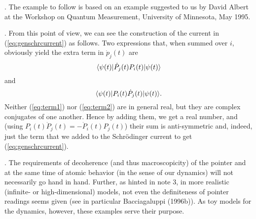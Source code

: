 \documentclass[12pt]{article}
\newcommand{\be}{\vspace*{6pt} \begin{equation}}
\newcommand{\ee}{\vspace*{10pt} \end{equation}}
\newcommand{\bra}[1]{\langle #1\vert}                           %
\newcommand{\ket}[1]{\vert #1\rangle}                           %
\begin{document}
\vspace*{12pt}

.  The example to follow is based on an example suggested to
us by David Albert at the Workshop on Quantum Measurement, University 
of Minnesota, May 1995.

\vspace*{12pt}

. From this point of view, we can see the construction of the
current in (\ref{eq:genschrcurrent}) as follows.  Two expressions 
that, when summed over $i$, obviously yield the extra term in 
$\dot{p}_j(t)$ are
\be
  \label{eq:term1}
  \bra{\psi(t)} \dot{P}_j(t) P_i(t) \ket{\psi(t)}
\ee
and
\be
  \label{eq:term2}
  \bra{\psi(t)} P_i(t) \dot{P}_j(t) \ket{\psi(t)}.
\ee
\noindent Neither (\ref{eq:term1}) nor (\ref{eq:term2}) are in general real,
but they are complex conjugates of one another.  Hence by adding them, 
we get a real number, and (using $P_i(t)\dot{P}_j(t) = - \dot{P}_i(t) 
P_j(t)$) their sum is anti-symmetric and, indeed, just the term that 
we added to the Schr\"odinger current to get 
(\ref{eq:genschrcurrent}).

\vspace*{12pt}

. The requirements of decoherence (and thus macroscopicity) of
the pointer and at the same time of atomic behavior (in the sense of 
our dynamics) will not necessarily go hand in hand.  Further, as 
hinted in note 3, in more realistic (infinite- or high-dimensional) 
models, not even the definiteness of pointer readings seems given (see 
in particular Bacciagaluppi (1996b)).  As toy models for the dynamics, 
however, these examples serve their purpose.
\end{document}
